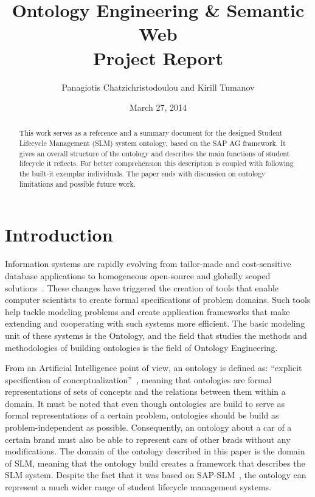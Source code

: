 \documentclass{article}    %
\title{Ontology Engineering \& Semantic Web \\ Project Report}  %
\author{Panagiotis Chatzichristodoulou and Kirill Tumanov}    %
\date{March 27, 2014}   %
\begin{document}
%
\maketitle                 %
%
\begin{abstract}
%
This work serves as a reference and a summary document for the designed Student Lifecycle Management (SLM) system ontology, based on the SAP AG framework. It gives an overall structure of the ontology and describes the main functions of student lifecycle it reflects. For better comprehension this description is coupled with following the built-it exemplar individuals. The paper ends with discussion on ontology limitations and possible future work.
%
\end{abstract}
%
% 
\section{Introduction}
%
Information systems are rapidly evolving from tailor-made and cost-sensitive database applications to homogeneous open-source and globally scoped solutions~\cite{Semantic Web Primer}. These changes have triggered the creation of tools that enable computer scientists to create formal specifications of problem domains. Such tools help tackle modeling problems and create application frameworks that make extending and cooperating with such systems more efficient. The basic modeling unit of these systems is the Ontology, and the field that studies the methods and methodologies of building ontologies is the field of Ontology Engineering.

 From an Artificial Intelligence point of view, an ontology is defined as: ``explicit specification of conceptualization''~\cite{Gruber}, meaning that ontologies are formal representations of sets of concepts and the relations between them within a domain. It must be noted that even though ontologies are build to serve as formal representations of a certain problem, ontologies should be build as problem-independent as possible. Consequently, an ontology about a car of a certain brand must also be able to represent cars of other brads without any modifications. The domain of the ontology described in this paper is the domain of SLM, meaning that the ontology build creates a framework that describes the SLM system. Despite the fact that it was based on SAP-SLM~\cite{sap}, the ontology can represent a much wider range of student lifecycle management systems.
% 
\end{document}
